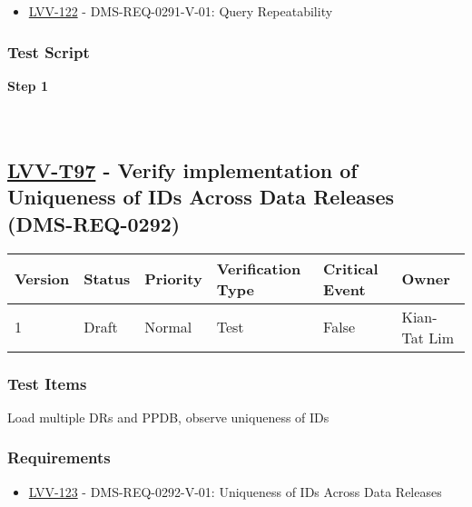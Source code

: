 \begin{itemize}
\tightlist
\item
  \href{https://jira.lsstcorp.org/browse/LVV-122}{LVV-122} -
  DMS-REQ-0291-V-01: Query Repeatability
\end{itemize}

\hypertarget{test-script-186}{%
\subsubsection{Test Script}\label{test-script-186}}

\textbf{Step 1}\\
~\\
~\\

\hypertarget{lvv-t97---verify-implementation-of-uniqueness-of-ids-across-data-releases-dms-req-0292}{%
\subsection{\texorpdfstring{\href{https://jira.lsstcorp.org/secure/Tests.jspa\#/testCase/LVV-T97}{LVV-T97}
- Verify implementation of Uniqueness of IDs Across Data Releases
(DMS-REQ-0292)}{LVV-T97 - Verify implementation of Uniqueness of IDs Across Data Releases (DMS-REQ-0292)}}\label{lvv-t97---verify-implementation-of-uniqueness-of-ids-across-data-releases-dms-req-0292}}

\begin{longtable}[]{@{}llllll@{}}
\toprule
Version & Status & Priority & Verification Type & Critical Event &
Owner\tabularnewline
\midrule
\endhead
1 & Draft & Normal & Test & False & Kian-Tat Lim\tabularnewline
\bottomrule
\end{longtable}

\hypertarget{test-items-186}{%
\subsubsection{Test Items}\label{test-items-186}}

Load multiple DRs and PPDB, observe uniqueness of IDs

\hypertarget{requirements-187}{%
\subsubsection{Requirements}\label{requirements-187}}

\begin{itemize}
\tightlist
\item
  \href{https://jira.lsstcorp.org/browse/LVV-123}{LVV-123} -
  DMS-REQ-0292-V-01: Uniqueness of IDs Across Data Releases
\end{itemize}

